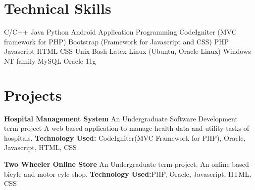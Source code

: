 \documentclass[11pt,a4paper,sans]{moderncv}
\begin{document}
\section{Technical Skills}
{
C/C++
\newline Java
\newline Python
\newline Android Application Programming 
}
{
CodeIgniter (MVC framework for PHP)
\newline Bootstrap (Framework for Javascript and CSS)
\newline PHP
\newline Javascript
\newline HTML
\newline CSS
}
{
Unix Bash
\newline Latex
}
{
Linux (Ubuntu, Oracle Linux)
\newline Windows NT family
}
{
MySQL
\newline Oracle 11g
}


\section{Projects}
{
\textbf{Hospital Management System}
\newline
An Undergraduate Software Development term project \newline
A web based application to manage health data and utility tasks of hospitals.
\newline \textbf{Technology Used: } CodeIgniter(MVC Framework for PHP), Oracle, Javascript, HTML, CSS
\newline}


{
\textbf{Two Wheeler Online Store}
\newline
An Undergraduate term project. An online based bicyle and motor cyle shop.
\newline \textbf{Technology Used:}PHP, Oracle, Javascript, HTML, CSS
\newline
}
\end{document}

